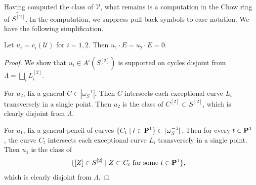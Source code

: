 \documentclass[11pt,reqno, letterpaper]{amsart}
\numberwithin{equation}{section}
\begin{document}
Having computed the class of $\mathcal V$, what remains is a computation in the Chow ring of $\widetilde{S^{[2]}}$.
In the computation, we suppress pull-back symbols to ease notation.
We have the following simplification.
\begin{proposition}
    \label{lemma:uE}
  Let $u_i = c_i(\mathcal U)$ for $i = 1, 2$.
  Then  $u_{1}\cdot E = u_{2} \cdot E = 0$.
\end{proposition}
\begin{proof}
  We show that $u_i \in A^i(S^{[2]})$ is supported on cycles disjoint from $\Lambda = \bigsqcup_i L^{[2]}_i$.

  For $u_2$, fix a general $C \in |\omega_S^{-1}|$.
  Then $C$ intersects each exceptional curve $L_i$ transversely in a single point.
  Then $u_2$ is the class of $C^{[2]} \subset S^{[2]}$, which is clearly disjoint from $\Lambda$.
  
  For $u_1$, fix a general pencil of curves $\{C_t \mid t \in \P^1\} \subset |\omega_S^{-1}|$.
  Then for every $t \in \P^1$, the curve $C_t$ intersects each exceptional curve $L_i$ transversely in a single point.
  Then $u_{1}$ is the class of
  \[\{[Z] \in S^{[2]} \mid Z \subset C_{t} \text{ for some $t\in \P^{1}$}\},\]
  which is clearly disjoint from $\Lambda$.
\end{proof}
\end{document}
